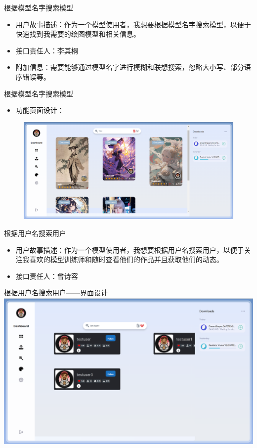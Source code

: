 \begin{frame}{根据模型名字搜索模型}
    \begin{itemize}
        \item 用户故事描述：作为一个模型使用者，我想要根据模型名字搜索模型，以便于快速找到我需要的绘图模型和相关信息。
        \item 接口责任人：李其桐
        \item 附加信息：需要能够通过模型名字进行模糊和联想搜索，忽略大小写、部分语序错误等。
    \end{itemize}
\end{frame}

\begin{frame}{根据模型名字搜索模型}
    \begin{itemize}
        \item 功能页面设计：
    \end{itemize}
    \begin{figure}[H]
        \centering
        \includegraphics[width=\textwidth]{contents/figure/search_model.png}
    \end{figure}
\end{frame}

\begin{frame}{根据用户名搜索用户}
    \begin{itemize}
        \item 用户故事描述：作为一个模型使用者，我想要根据用户名搜索用户，以便于关注我喜欢的模型训练师和随时查看他们的作品并且获取他们的动态。
        \item 接口责任人：曾诗容
    \end{itemize}
\end{frame}

\begin{frame}{根据用户名搜索用户——界面设计}
    \includegraphics[width=1\textwidth]{contents/figure/search_user.png}
\end{frame}


